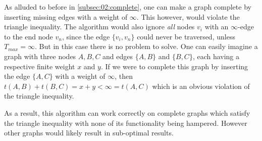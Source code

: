 As alluded to before in \cref{subsec:02:complete}, one can make a graph complete by inserting missing edges with a weight of $\infty$.
This however, would violate the triangle inequality.
The algorithm would also ignore \emph{all} nodes $v_i$ with an $\infty$-edge to the end node $v_n$, since the edge $\{v_i, v_n\}$ could never be traversed, unless $T_{max} = \infty$.
But in this case there is no problem to solve.
One can easily imagine a graph with three nodes $A, B, C$ and edges $\{A, B\}$ and $\{B, C\}$, each having a respective finite weight $x$ and $y$.
If we were to complete this graph by inserting the edge $\{A, C\}$ with a weight of $\infty$, then $t(A, B) + t(B,C) = x + y < \infty = t(A, C)$
which is an obvious violation of the triangle inequality.

As a result, this algorithm can work correctly on complete graphs which satisfy the triangle inequality with none of its functionality being hampered.
However other graphs would likely result in sub-optimal results. 
